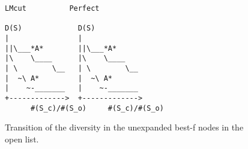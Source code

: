 \begin{figure}[htbp]
\begin{verbatim}
LMcut          Perfect       

D(S)             D(S)                             
|                |             
||\___*A*        ||\___*A*      
|\    \____      |\    \____   
| \        \__   | \        \__
|  ~\ A*         |  ~\ A*      
|    ~-_______   |    ~-_______
+------------->  +------------->
      #(S_c)/#(S_o)     #(S_c)/#(S_o)
\end{verbatim}
\caption{Transition of the diversity in the unexpanded best-f nodes in the open list.}
\label{diversity-transition}
\end{figure}